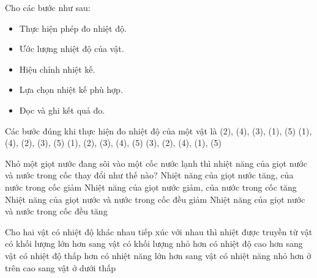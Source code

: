 \begin{ex}
	Cho các bước như sau:
	\begin{itemize}
		\item[(1)] Thực hiện phép đo nhiệt độ.
		\item[(2)] Ước lượng nhiệt độ của vật.
		\item[(3)] Hiệu chỉnh nhiệt kế.
		\item[(4)] Lựa chọn nhiệt kế phù hợp.
		\item[(5)] Đọc và ghi kết quả đo.
	\end{itemize}
	Các bước đúng khi thực hiện đo nhiệt độ của một vật là
	\choice
	{\True (2), (4), (3), (1), (5)}
	{(1), (4), (2), (3), (5)}
	{(1), (2), (3), (4), (5)}
	{(3), (2), (4), (1), (5)}
	\end{ex}







\begin{ex}%
	Nhỏ một giọt nước đang sôi vào một cốc nước lạnh thì nhiệt năng của giọt nước và nước trong cốc thay đổi như thế nào?
	\choice
	{Nhiệt năng của giọt nước tăng, của nước trong cốc giảm}
	{\True Nhiệt năng của giọt nước giảm, của nước trong cốc tăng}
	{Nhiệt năng của giọt nước và nước trong cốc đều giảm}
	{Nhiệt năng của giọt nước và nước trong cốc đều tăng}
	\end{ex}





\begin{ex}
	Cho hai vật có nhiệt độ khác nhau tiếp xúc với nhau thì nhiệt được truyền từ vật 
	\choice
	{có khối lượng lớn hơn sang vật có khối lượng nhỏ hơn}
	{\True có nhiệt độ cao hơn sang vật có nhiệt độ thấp hơn}
	{có nhiệt năng lớn hơn sang vật có nhiệt năng nhỏ hơn}
	{ở trên cao sang vật ở dưới thấp}
	\end{ex}


